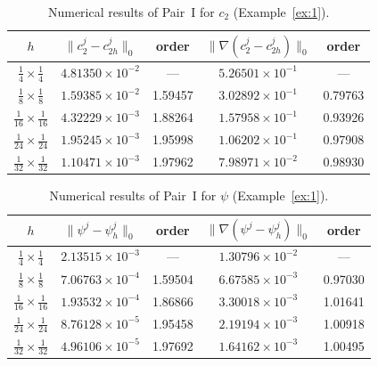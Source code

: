 \documentclass[a4paper,fleqn]{cas-sc}
\numberwithin{equation}{section}
\theoremstyle{definition}
\begin{document}
\begin{table}[htbp]
\centering
\caption{Numerical results of Pair~I for $c_{2}$ (Example~\ref{ex:1}).}
\label{tab:PairI-c2}
\begin{tabular}{ccccc}
\hline
$h$ &
$\|c_{2}^{j} - c_{2h}^{j}\|_{0}$ & order &
$\|\nabla(c_{2}^{j} - c_{2h}^{j})\|_{0}$ & order \\
\hline
$\tfrac{1}{4} \times \tfrac{1}{4}$   & $4.81350\times10^{-2}$ & ---     & $5.26501\times10^{-1}$ & ---     \\
$\tfrac{1}{8} \times \tfrac{1}{8}$   & $1.59385\times10^{-2}$ & 1.59457 & $3.02892\times10^{-1}$ & 0.79763 \\
$\tfrac{1}{16}\times \tfrac{1}{16}$  & $4.32229\times10^{-3}$ & 1.88264 & $1.57958\times10^{-1}$ & 0.93926 \\
$\tfrac{1}{24}\times \tfrac{1}{24}$  & $1.95245\times10^{-3}$ & 1.95998 & $1.06202\times10^{-1}$ & 0.97908 \\
$\tfrac{1}{32}\times \tfrac{1}{32}$  & $1.10471\times10^{-3}$ & 1.97962 & $7.98971\times10^{-2}$ & 0.98930 \\
\hline
\end{tabular}
\end{table}

\begin{table}[htbp]
\centering
\caption{Numerical results of Pair~I for $\psi$ (Example~\ref{ex:1}).}
\label{tab:PairI-psi}
\begin{tabular}{ccccc}
\hline
$h$ &
$\|\psi^{j} - \psi_{h}^{j}\|_{0}$ & order &
$\|\nabla(\psi^{j} - \psi_{h}^{j})\|_{0}$ & order \\
\hline
$\tfrac{1}{4} \times \tfrac{1}{4}$   & $2.13515\times10^{-3}$ & ---     & $1.30796\times10^{-2}$ & ---     \\
$\tfrac{1}{8} \times \tfrac{1}{8}$   & $7.06763\times10^{-4}$ & 1.59504 & $6.67585\times10^{-3}$ & 0.97030 \\
$\tfrac{1}{16}\times \tfrac{1}{16}$  & $1.93532\times10^{-4}$ & 1.86866 & $3.30018\times10^{-3}$ & 1.01641 \\
$\tfrac{1}{24}\times \tfrac{1}{24}$  & $8.76128\times10^{-5}$ & 1.95458 & $2.19194\times10^{-3}$ & 1.00918 \\
$\tfrac{1}{32}\times \tfrac{1}{32}$  & $4.96106\times10^{-5}$ & 1.97692 & $1.64162\times10^{-3}$ & 1.00495 \\
\hline
\end{tabular}
\end{table}
\end{document}
